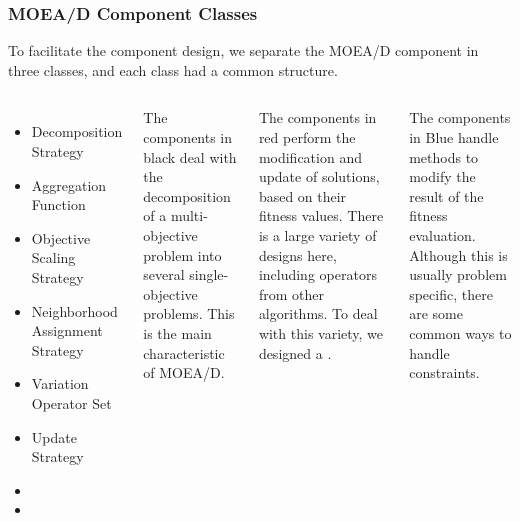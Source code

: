 \documentclass[aspectratio=169]{beamer}
\begin{document}
\begin{frame}
  \frametitle{MOEA/D Component Classes}

  \begin{block}{}
    To facilitate the component design, we separate the MOEA/D
    component in three classes, and each class had a common structure.
  \end{block}\bigskip

  {\smaller
  \begin{columns}
      \begin{itemize}
      \item Decomposition Strategy
      \item Aggregation Function
      \item Objective Scaling Strategy
      \item \alert{Neighborhood Assignment Strategy}
      \item \alert{Variation Operator Set}
      \item \alert{Update Strategy}
      \item {}
      \item {}
      \end{itemize}
      
      \begin{alert}{}
        The components in black deal with the decomposition of a
        multi-objective problem into several single-objective
        problems. This is the main characteristic of MOEA/D.

      \end{alert}
      \begin{alertblock}{}
        The components in red perform the modification and update of
        solutions, based on their fitness values. There is a large
        variety of designs here, including operators from other
        algorithms.  To deal with this variety, we designed a
        .
      \end{alertblock}
      \begin{exampleblock}{}
        The components in Blue handle methods to modify the result of
        the fitness evaluation. Although this is usually problem
        specific, there are some common ways to handle constraints.
      \end{exampleblock}
  \end{columns}
  }
\end{frame}
\end{document}
